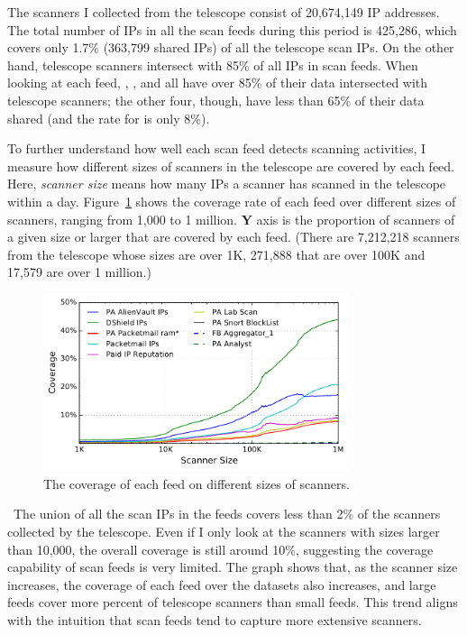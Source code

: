 The scanners I collected from the telescope consist of 20,674,149 IP addresses.
The total number of IPs in all the scan feeds during this period is
425,286, which covers only 1.7\% (363,799 shared IPs) of all the telescope scan IPs.
On the other hand, telescope scanners intersect with 85\% of all IPs in scan feeds.
When looking at each feed, {\feedTSAlienVault}, {\feeddshield}
{\feedpacketmail}, {\feedTSLabScan} and {\feedTSramnode} all have over 85\% of their
data intersected with telescope scanners; the other four, though, have less than 65\%
of their data shared (and the rate for {\feedTSSnort} is only 8\%).


To further understand how well each scan feed detects scanning
activities, I measure how different sizes of scanners in the
telescope are covered by each feed. Here, \emph{scanner size} means how
many IPs a scanner has scanned in the telescope within a
day. Figure~\ref{fig:caida_coverage_cdf} shows the coverage rate of
each feed over different sizes of scanners, ranging from 1,000 to
1 million. \textbf{Y} axis is the proportion of scanners of a given size or 
larger that are covered by each feed. (There are 7,212,218 scanners from the 
telescope whose sizes
are over 1K, 271,888 that are over 100K and 17,579 are over 1 million.)


\begin{figure}
\centering
\includegraphics[width=0.8\textwidth]{data_character/images/caida_coverage_cdf.pdf}
\caption{The coverage of each feed on different sizes of scanners.}
\label{fig:caida_coverage_cdf}
\end{figure}

\finding\
The union of all the scan IPs in the feeds covers less than
2\% of the scanners collected by the telescope. Even if I only look
at the scanners with sizes larger than 10,000, the overall coverage is still
around 10\%, suggesting the coverage capability of scan feeds
is very limited. The graph shows that, as the scanner size increases, the coverage of
each feed over the datasets also increases, and large feeds cover more percent
of telescope scanners than small feeds. This trend aligns with the intuition that
scan feeds tend to capture more extensive scanners.


